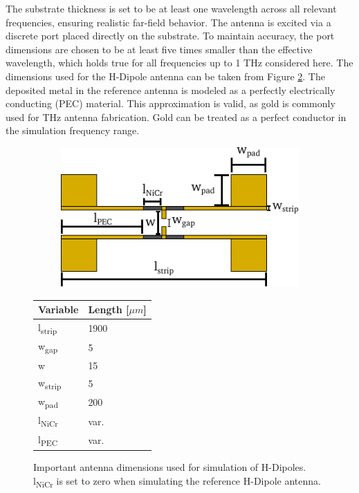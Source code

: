 The substrate thickness is set to be at least one wavelength across all relevant frequencies, ensuring realistic far-field behavior. The antenna is excited via a discrete port placed directly on the substrate. To maintain accuracy, the port dimensions are chosen to be at least five times smaller than the effective wavelength, which holds true for all frequencies up to \num{1} \si{\tera\hertz} considered here. The dimensions used for the H-Dipole antenna can be taken from Figure \ref{fig:sim_dimensions}. The deposited metal in the reference antenna is modeled as a perfectly electrically conducting (PEC) material. This approximation is valid, as gold is commonly used for THz antenna fabrication. Gold can be treated as a perfect conductor in the simulation frequency range.

\begin{figure}[htbp]
    \centering
        \begin{subfigure}[c]{0.45\textwidth}
        \centering
        \includegraphics[width=\linewidth]{figures/sim_NICR_abmessungen.pdf}
        \label{fig:NICR}
    \end{subfigure}
    \hspace{0.1em}
    \begin{subtable}[c]{0.45\textwidth}
        \centering
        \begin{tabular}{ll}
        \toprule
        Variable & Length [$\mu m$]\\
        \midrule
        l\textsubscript{strip} & 1900 \\
        w\textsubscript{gap} & 5 \\
        w & 15 \\
        w\textsubscript{strip} & 5 \\
        w\textsubscript{pad} & 200 \\
        l\textsubscript{NiCr} & var. \\
        l\textsubscript{PEC} & var. \\
        \bottomrule
        \end{tabular}
        \label{tab:table}
    \end{subtable}
    \caption{Important antenna dimensions used for simulation of H-Dipoles. l\textsubscript{NiCr} is set to zero when simulating the reference H-Dipole antenna.}
    \label{fig:sim_dimensions}
\end{figure}


